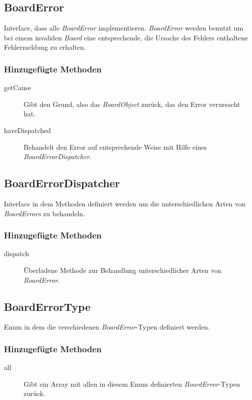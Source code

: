 \subsection{BoardError}
	Interface, dass alle \emph{BoardError} implementieren. \emph{BoardError} werden benutzt um bei einem invaliden
	 \emph{Board} eine entsprechende, die Ursache des Fehlers enthaltene Fehlermeldung zu erhalten.
	\subsubsection{Hinzugefügte Methoden}
	\begin{description}
		\item[getCause]
			Gibt den Grund, also das \emph{BoardObject} zurück, das den Error verursacht hat.
		\item[haveDispatched]
			Behandelt den Error auf entsprechende Weise mit Hilfe eines \emph{BoardErrorDispatcher}.
	\end{description}

\subsection{BoardErrorDispatcher}
	Interface in dem Methoden definiert werden um die unterschiedlichen Arten von \emph{BoardErrors} zu behandeln.
	\subsubsection{Hinzugefügte Methoden}
	\begin{description}
		\item[dispatch]
			Überladene Methode zur Behandlung unterschiedlicher Arten von \emph{BoardError}.
	\end{description}

\subsection{BoardErrorType}
	Enum in dem die verschiedenen \emph{BoardError}-Typen definiert werden.
	\subsubsection{Hinzugefügte Methoden}
	\begin{description}
		\item[all]
			Gibt ein Array mit allen in diesem Enum definierten \emph{BoardError}-Typen zurück.
	\end{description}

